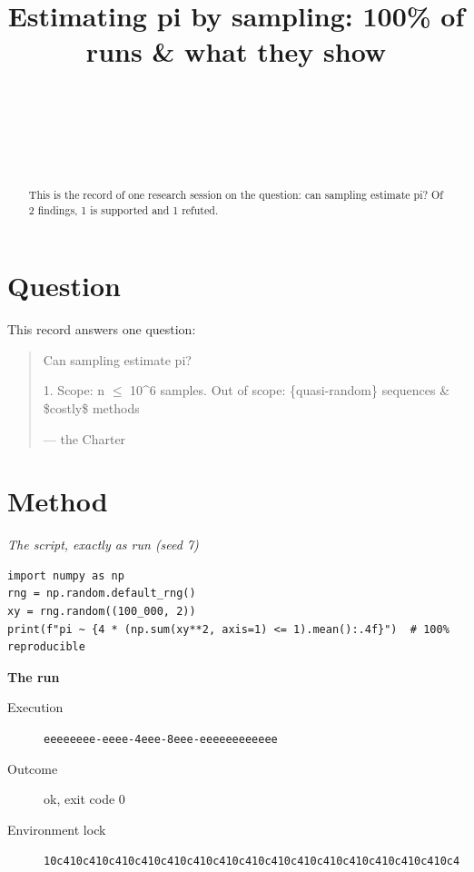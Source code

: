 \documentclass[conference]{IEEEtran}
\newcommand{\sheepquote}[2]{\begin{quote}\small #1\par\nopagebreak\raggedleft--- #2\end{quote}}
\begin{document}
\title{Estimating pi by sampling: 100\% of runs \& what they show}
\author{\\ \and {}\\ \and {}\\}
\maketitle
\begin{abstract}
This is the record of one research session on the question: can sampling estimate pi?
Of 2 findings, 1 is supported and 1 refuted.
\end{abstract}

\section{Question}

This record answers one question:

\sheepquote{Can sampling estimate pi?

1. Scope: n $\leq$ 10\textasciicircum{}6 samples\newline
2. Out of scope: \{quasi-random\} sequences \& \$costly\$ methods}{the Charter}

\section{Method}

\noindent\textit{The script, exactly as run (seed 7)}
\begin{lstlisting}
import numpy as np
rng = np.random.default_rng()
xy = rng.random((100_000, 2))
print(f"pi ~ {4 * (np.sum(xy**2, axis=1) <= 1).mean():.4f}")  # 100% reproducible
\end{lstlisting}

\noindent\textbf{The run}
\begin{description}
\item[Execution] \texttt{eeeeeeee\allowbreak{}-\allowbreak{}eeee\allowbreak{}-\allowbreak{}4eee\allowbreak{}-\allowbreak{}8eee\allowbreak{}-\allowbreak{}eeeeeeee\allowbreak{}eeee}
\item[Outcome] ok, exit code 0
\item[Environment lock] \texttt{10c410c4\allowbreak{}10c410c4\allowbreak{}10c410c4\allowbreak{}10c410c4\allowbreak{}10c410c4\allowbreak{}10c410c4\allowbreak{}10c410c4\allowbreak{}10c410c4}
\end{description}
\end{document}
